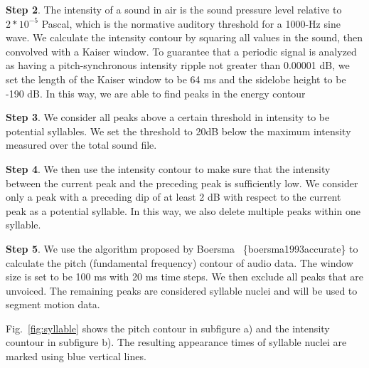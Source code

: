 %
%


\textbf{Step 2}. 
The intensity of a sound in air is the sound pressure level relative to $2*10^{-5}$ Pascal, which is the normative auditory threshold for a 1000-Hz sine wave. We calculate the intensity contour by squaring all values in the sound, then convolved with a Kaiser window.  To guarantee that a periodic signal is analyzed as having a pitch-synchronous intensity ripple not greater than 0.00001 dB, we set the length of the Kaiser window to be 64 ms and the sidelobe height to be -190 dB. In this way, we are able to find peaks in the energy contour

%

%
%

\textbf{Step 3}. We consider all peaks above a certain threshold
in intensity to be potential syllables. We set the threshold
to 20dB below the maximum intensity measured over the
total sound file.

\textbf{Step 4}. We then use the intensity contour to make sure that the intensity between the current peak and the preceding peak is sufficiently low.  We consider only a peak with a preceding dip of at least 2 dB with respect to the current peak as a potential syllable. In this way, we also delete multiple peaks within one syllable.

\textbf{Step 5}.
We use the algorithm proposed by Boersma ~\{boersma1993accurate\} to calculate the pitch (fundamental frequency) contour of audio data. The window size is set to be  100 ms with 20 ms time steps. We then exclude all peaks that are unvoiced. The remaining peaks are considered syllable nuclei and will be used to segment motion data.

Fig.~\ref{fig:syllable} shows the pitch contour in subfigure a) and the intensity countour in subfigure b). The resulting appearance times of syllable nuclei are marked using blue vertical lines.





